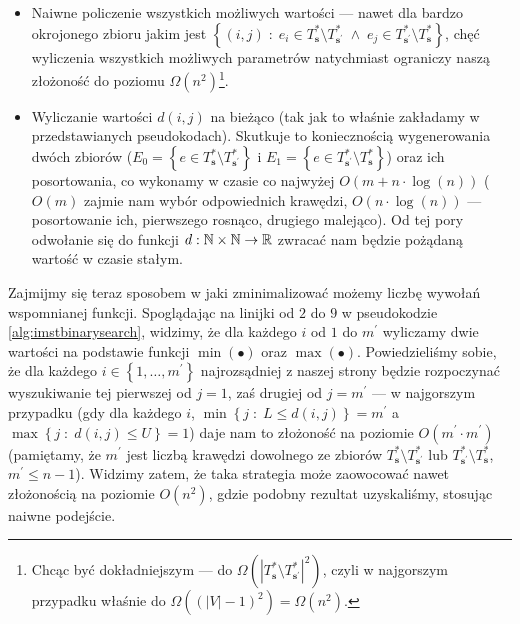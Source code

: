 \begin{itemize}
	\item Naiwne policzenie wszystkich możliwych wartości --- nawet dla bardzo okrojonego zbioru jakim jest $\left\{ \left( i, j \right) \; : \; e_{i} \in T^{\ast}_{\textbf{s}} \setminus T^{\ast}_{\textbf{s}^{\prime}} \; \wedge \; e_{j} \in T^{\ast}_{\textbf{s}^{\prime}} \setminus T^{\ast}_{\textbf{s}} \right\}$, chęć wyliczenia wszystkich możliwych parametrów natychmiast ograniczy naszą złożoność do poziomu $\Omega \left( n^{2} \right)$\footnote{Chcąc być dokładniejszym --- do $\Omega \left( \left| T^{\ast}_{\textbf{s}} \setminus T^{\ast}_{\textbf{s}^{\prime}} \right|^{2} \right)$, czyli w najgorszym przypadku właśnie do $\Omega \left( \left( \left| V \right| - 1 \right)^{2} \right) = \Omega \left( n^{2} \right)$.}.
	\item Wyliczanie wartości $d \left( i, j \right)$ na bieżąco (tak jak to właśnie zakładamy w przedstawianych pseudokodach). Skutkuje to koniecznością wygenerowania dwóch zbiorów ($E_{0} = \left\{ e \in T^{\ast}_{\textbf{s}} \setminus T^{\ast}_{\textbf{s}^{\prime}} \right\}$ i $E_{1} = \left\{ e \in T^{\ast}_{\textbf{s}^{\prime}} \setminus T^{\ast}_{\textbf{s}} \right\}$) oraz ich posortowania, co wykonamy w czasie co najwyżej $O \left( m + n \cdot \log \left( n \right) \right)$ ($O \left( m \right)$ zajmie nam wybór odpowiednich krawędzi, $O \left( n \cdot \log \left( n \right) \right)$ --- posortowanie ich, pierwszego rosnąco, drugiego malejąco). Od tej pory odwołanie się do funkcji $d: \mathbb{N} \times \mathbb{N} \rightarrow \mathbb{R}$ zwracać nam będzie pożądaną wartość w czasie stałym.
\end{itemize}

Zajmijmy się teraz sposobem w jaki zminimalizować możemy liczbę wywołań wspomnianej funkcji. Spoglądając na linijki od $2$ do $9$ w pseudokodzie \ref{alg:imstbinarysearch}, widzimy, że dla każdego $i$ od $1$ do $m^{\prime}$ wyliczamy dwie wartości na podstawie funkcji $\min \left( \bullet \right)$ oraz $\max \left( \bullet \right)$. Powiedzieliśmy sobie, że dla każdego $i \in \left\{ 1, \dots, m^{\prime} \right\}$ najrozsądniej z naszej strony będzie rozpoczynać wyszukiwanie tej pierwszej od $j = 1$, zaś drugiej od $j = m^{\prime}$ --- w najgorszym przypadku (gdy dla każdego $i$, $\min \left\{ j \; : \; L \leqslant d \left( i, j \right) \right\} = m^{\prime}$ a $\max \left\{ j \; : \; d \left( i, j \right) \leqslant U \right\} = 1$) daje nam to złożoność na poziomie $O \left( m^{\prime} \cdot m^{\prime} \right)$ (pamiętamy, że $m^{\prime}$ jest liczbą krawędzi dowolnego ze zbiorów $T^{\ast}_{\textbf{s}} \setminus T^{\ast}_{\textbf{s}^{\prime}}$ lub $T^{\ast}_{\textbf{s}^{\prime}} \setminus T^{\ast}_{\textbf{s}}$, $m^{\prime} \leqslant n - 1$). Widzimy zatem, że taka strategia może zaowocować nawet złożonością na poziomie $O \left( n^{2} \right)$, gdzie podobny rezultat uzyskaliśmy, stosując naiwne podejście.

